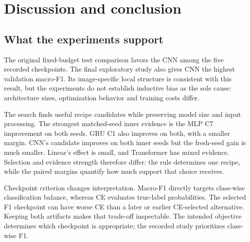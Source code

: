 \clearpage
\section{Discussion and conclusion}
\subsection{What the experiments support}
The original fixed-budget test comparison favors the CNN among the five recorded checkpoints. The final exploratory study also gives CNN the highest validation macro-F1. Its image-specific local structure is consistent with this result, but the experiments do not establish inductive bias as the sole cause: architecture sizes, optimization behavior and training costs differ.

The search finds useful recipe candidates while preserving model size and input processing. The strongest matched-seed inner evidence is the MLP C7 improvement on both seeds. GRU C1 also improves on both, with a smaller margin. CNN's candidate improves on both inner seeds but the fresh-seed gain is much smaller. Linear's effect is small, and Transformer has mixed evidence. Selection and evidence strength therefore differ: the rule determines one recipe, while the paired margins quantify how much support that choice receives.

Checkpoint criterion changes interpretation. Macro-F1 directly targets class-wise classification balance, whereas CE evaluates true-label probabilities. The selected F1 checkpoint can have worse CE than a later or earlier CE-selected alternative. Keeping both artifacts makes that trade-off inspectable. The intended objective determines which checkpoint is appropriate; the recorded study prioritizes class-wise F1.

